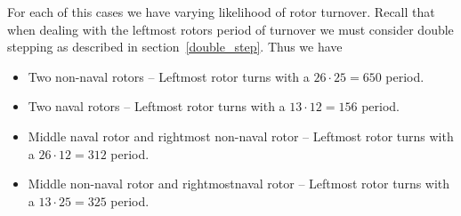 For each of this cases we have varying likelihood of rotor turnover. Recall that when dealing with the leftmost rotors period of turnover we must consider double stepping as described in section~\ref{double_step}. Thus we have

\begin{itemize}
	\item Two non-naval rotors -- Leftmost rotor turns with a $26\cdot25 = 650$ period.
	\item Two naval rotors --  Leftmost rotor turns with a $13\cdot12 = 156$ period.
	\item Middle naval rotor and rightmost non-naval rotor --  Leftmost rotor turns with a $26\cdot12 = 312$ period.
	\item Middle non-naval rotor and rightmostnaval rotor --  Leftmost rotor turns with a $13\cdot25 = 325$ period.
\end{itemize}

